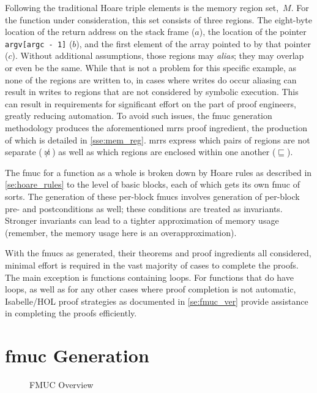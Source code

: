 Following the traditional Hoare triple elements is the memory region set,~$M$.
For the function under consideration, this set consists of three regions.
The eight-byte location of the return address
on the stack frame (\hyperlink{m:a}{$a$}),
the location of the pointer \lstinline|argv[argc - 1]| (\hyperlink{m:b}{$b$}),
and the first element of the array pointed to by that pointer (\hyperlink{m:c}{$c$}).
Without additional assumptions, those regions may \emph{alias};
they may overlap or even be the same.
While that is not a problem for this specific example,
as none of the regions are written to,
in cases where writes do occur
aliasing can result in writes to regions that are not considered by symbolic execution.
This can result in requirements for significant effort on the part of proof engineers,
greatly reducing automation.
To avoid such issues, the \ac{fmuc} generation methodology
produces the aforementioned \acp{mrr} proof ingredient,
the production of which is detailed in \cref{sse:mem_reg}.
\Acp{mrr} express which pairs of regions are not separate ($\not\bowtie$)
as well as which regions are enclosed within one another ($\sqsubseteq$).

The \ac{fmuc} for a function as a whole is broken down by Hoare rules
as described in \cref{se:hoare_rules} to the level of basic blocks,
each of which gets its own \ac{fmuc} of sorts.
The generation of these per-block \acp{fmuc} involves generation of per-block
pre- and postconditions as well; these conditions are treated as invariants.
Stronger invariants can lead to a tighter approximation of memory usage
(remember, the memory usage here is an overapproximation).

With the \acp{fmuc} as generated, their theorems and proof ingredients all considered,
minimal effort is required in the vast majority of cases to complete the proofs.
The main exception is functions containing loops.
For functions that do have loops, as well as for any other cases where proof completion
is not automatic, Isabelle/HOL proof strategies as documented in \cref{se:fmuc_ver}
provide assistance in completing the proofs efficiently.

\section{\acs*{fmuc} Generation}\label{se:fmuc_gen}
\begin{figure*}
  \centering
  \caption{FMUC Overview}\label{fig:overview}
\end{figure*}

